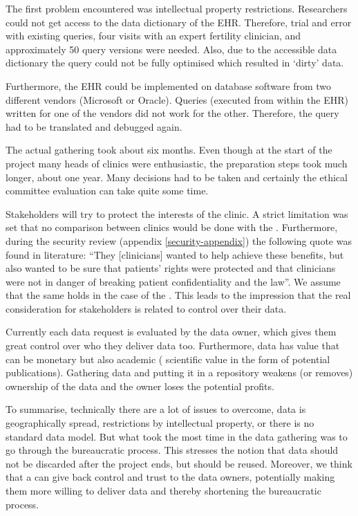 The first problem encountered was intellectual property restrictions.
Researchers could not get access to the data dictionary of the EHR.
Therefore, trial and error with existing queries, four visits with an expert fertility clinician, and approximately 50 query versions were needed.
Also, due to the accessible data dictionary the query could not be fully optimised which resulted in `dirty' data.

Furthermore, the EHR could be implemented on database software from two different vendors (Microsoft or Oracle).
Queries (executed from within the EHR) written for one of the vendors did not work for the other.
Therefore, the query had to be translated and debugged again.


The actual gathering took about six months.
Even though at the start of the project many heads of clinics were enthusiastic, the preparation steps took much longer, about one year.
Many decisions had to be taken and certainly the ethical committee evaluation can take quite some time. 

Stakeholders will try to protect the interests of the clinic.
A strict limitation was set that no comparison between clinics would be done with the \projectdata{}.
Furthermore, during the security review (appendix \ref{security-appendix}) the following quote was found in literature: ``They [clinicians] wanted to help achieve these benefits, but also wanted to be sure that patients' rights were protected and that clinicians were not in danger of breaking patient confidentiality and the law''.
We assume that the same holds in the case of the \project{}.
This leads to the impression that the real consideration for stakeholders is related to control over their data.

Currently each data request is evaluated by the data owner, which gives them great control over who they deliver data too.
Furthermore, data has value that can be monetary but also academic (\ie{} scientific value in the form of potential publications).
Gathering data and putting it in a repository weakens (or removes) ownership of the data and the owner loses the potential profits.

To summarise, technically there are a lot of issues to overcome, \eg{} data is geographically spread, restrictions by intellectual property, or there is no standard data model.
But what took the most time in the \project{} data gathering was to go through the bureaucratic process.
This stresses the notion that data should not be discarded after the project ends, but should be reused.
Moreover, we think that a \ivfsystem{} can give back control and trust to the data owners,
potentially making them more willing to deliver data and thereby shortening the bureaucratic process.


